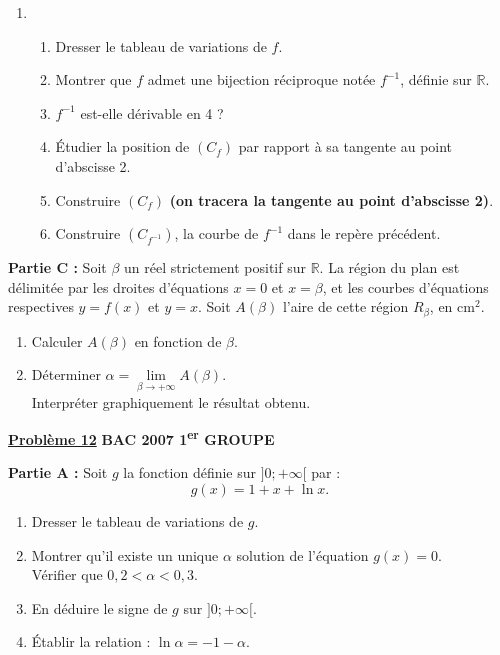 \documentclass[12pt,a4paper]{article}
\newcommand{\exo}[1]{%
        \textbf{\underline{Problème #1}}
}
\begin{document}
\begin{multicols}{2}
\begin{enumerate}
\begin{enumerate}
        \item Préciser la position de \( (C_f) \) par rapport à la droite \( (\Delta) : y = x \).
    \end{enumerate}
    \item 
    \begin{enumerate} 
            \item Dresser le tableau de variations de \( f \).

            \item Montrer que \( f \) admet une bijection réciproque notée \( f^{-1} \), définie sur \( \mathbb{R} \).

            \item \( f^{-1} \) est-elle dérivable en 4 ?

            \item Étudier la position de \( (C_f) \) par rapport à sa tangente au point d’abscisse 2.

            \item Construire \( (C_f) \) \textbf{(on tracera la tangente au point d’abscisse 2)}.

            \item Construire \( (C_{f^{-1}}) \), la courbe de \( f^{-1} \) dans le repère précédent.
    \end{enumerate}
\end{enumerate}
\textbf{Partie C :} Soit \( \beta \) un réel strictement positif sur \( \mathbb{R} \). La région du plan est délimitée par les droites d’équations \( x = 0 \) et \( x = \beta \), et les courbes d’équations respectives \( y = f(x) \) et \( y = x \). Soit \( A(\beta) \) l’aire de cette région \( R_\beta \), en \( \text{cm}^2 \).

\begin{enumerate}
    \item Calculer \( A(\beta) \) en fonction de \( \beta \).
    \item Déterminer \( \alpha = \lim\limits_{\beta \to +\infty} A(\beta) \).\\
    Interpréter graphiquement le résultat obtenu.
\end{enumerate}

\exo{12} \textbf{BAC 2007 1\textsuperscript{er} GROUPE}

\textbf{Partie A :} Soit \( g \) la fonction définie sur \( ]0 ; +\infty[ \) par :
\[
g(x) = 1 + x + \ln x.
\]

\begin{enumerate}
    \item Dresser le tableau de variations de \( g \).
    \item Montrer qu’il existe un unique \( \alpha \) solution de l’équation \( g(x) = 0 \).\\
    Vérifier que \( 0{,}2 < \alpha < 0{,}3 \).
    \item En déduire le signe de \( g \) sur \( ]0 ; +\infty[ \).
    \item Établir la relation : \( \ln \alpha = -1 - \alpha \).
\end{enumerate}


\end{multicols}
\end{document}
